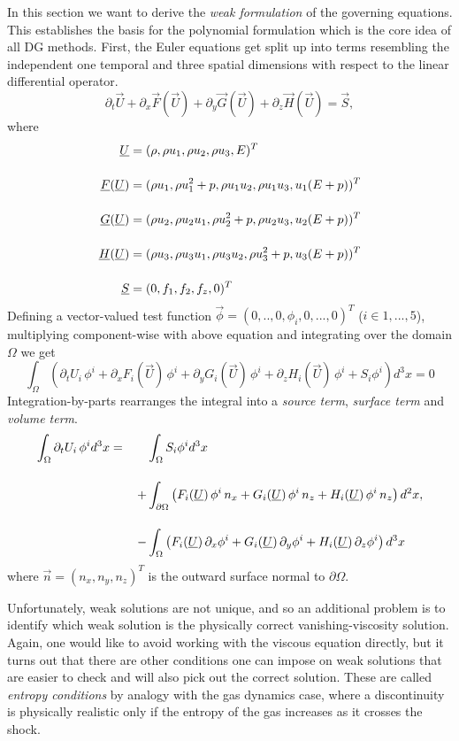 In this section we want to derive the \emph{weak formulation} of the governing
equations. This establishes the basis for the polynomial formulation which is
the core idea of all DG methods.  First, the Euler equations get split up into
terms resembling the independent one temporal and three spatial
dimensions with respect to the linear differential operator.
\begin{equation}
\partial_t \vec{U} + \partial_x\vec{F}(\vec{U})+ \partial_y\vec{G}(\vec{U}) + \partial_z\vec{H}(\vec{U}) = \vec{S},
\end{equation}
where
\begin{align}
    \vec{U} &= (\dens, \dens\vels_1, \dens\vels_2, \dens\vels_3, \Ener)^T\br
    \vec{F}(\vec{U}) &= (\dens\vels_1, \dens\vels_1^2 + \pres, \dens\vels_1\vels_2, \dens\vels_1\vels_3, \vels_1(\Ener + \pres))^T\br
    \vec{G}(\vec{U}) &= (\dens\vels_2, \dens\vels_2\vels_1, \dens\vels_2^2 + \pres, \dens\vels_2\vels_3, \vels_2(\Ener + \pres))^T\br
    \vec{H}(\vec{U}) &= (\dens\vels_3, \dens\vels_3\vels_1, \dens\vels_3\vels_2, \dens\vels_3^2 + \pres, \vels_3(\Ener + \pres))^T\br
    \vec{S} &= (0,f_1,f_2,f_z,0)^T
\end{align}
Defining a vector-valued test function $\vec{\phi} = (0,..,0,\phi_i,0,...,0)^T$ ($i\in{1,...,5}$), multiplying component-wise
with above equation and integrating over the domain $\Omega$ we get
\begin{equation}
    \int_\Omega \left( \partial_tU_i\,\phi^i 
        + \partial_x F_i(\vec{U})\,\phi^i 
        + \partial_y G_i(\vec{U})\,\phi^i 
        + \partial_z H_i(\vec{U})\,\phi^i + S_i \phi^i \right) d^3x = 0
\end{equation}
Integration-by-parts rearranges the integral into a \emph{source term},
\emph{surface term} and \emph{volume term}.
\begin{align}
\label{eqn:weak-formulation}
    \int_\Omega \partial_t U_i\,\phi^i d^3x = \;\;\;\;\;\;\;&\int_\Omega S_i \phi^i d^3x \br
    +& \int_{\partial\Omega} \left(F_i(\vec{U})\,\phi^i\,n_x + G_i(\vec{U})\,\phi^i\,n_z + H_i(\vec{U})\,\phi^i\,n_z \right) d^2x,\nonumber \br
    -& \int_\Omega \left(F_i(\vec{U})\,\partial_x \phi^i + G_i(\vec{U})\,\partial_y \phi^i + H_i(\vec{U})\,\partial_z \phi^i \right) d^3x
\end{align}
where $\vec{n} = (n_x,n_y,n_z)^T$ is the outward surface normal to $\partial\Omega$.

Unfortunately, weak solutions are not unique, and so an additional problem is
to identify which weak solution is the physically correct vanishing-viscosity
solution. Again, one would like to avoid working with the viscous equation
directly, but it turns out that there are other conditions one can impose on
weak solutions that are easier to check and will also pick out the correct
solution. These are called \emph{entropy conditions} by analogy with the gas
dynamics case, where a discontinuity is physically realistic only if the
entropy of the gas increases as it crosses the shock.
